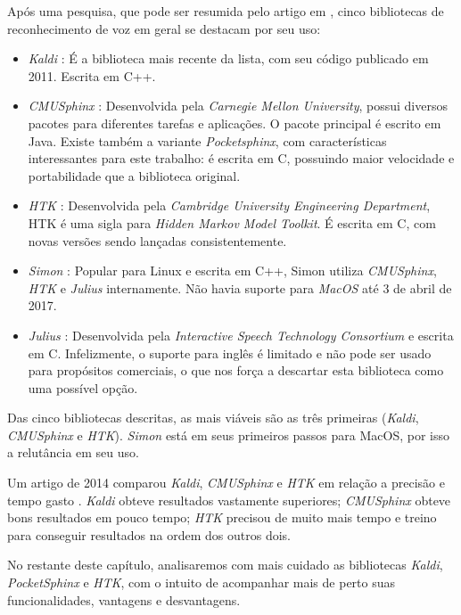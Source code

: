 Após uma pesquisa, que pode ser resumida pelo artigo em \citep{speechRecog:16}, cinco bibliotecas de reconhecimento de voz em geral se destacam por seu uso:

\begin{itemize}
\item \emph{Kaldi} \citep{kaldi}: É a biblioteca mais recente da lista, com seu código publicado em 2011. Escrita em C++.

\item \emph{CMUSphinx} \citep{cmusphinx}: Desenvolvida pela \emph{Carnegie Mellon University}, possui diversos pacotes para diferentes tarefas e aplicações. O pacote principal é escrito em Java. Existe também a variante \emph{Pocketsphinx}, com características interessantes para este trabalho: é escrita em C, possuindo maior velocidade e portabilidade que a biblioteca original.

\item \emph{HTK} \citep{htk}: Desenvolvida pela \emph{Cambridge University Engineering Department}, HTK é uma sigla para \emph{Hidden Markov Model Toolkit}. É escrita em C, com novas versões sendo lançadas consistentemente.

\item \emph{Simon} \citep{Simon}: Popular para Linux e escrita em C++, Simon utiliza \emph{CMUSphinx}, \emph{HTK} e \emph{Julius} internamente. Não havia suporte para \emph{MacOS} até 3 de abril de 2017.

\item \emph{Julius} \citep{Julius}: Desenvolvida pela \emph{Interactive Speech Technology Consortium} e escrita em C. Infelizmente, o suporte para inglês é limitado e não pode ser usado para propósitos comerciais, o que nos força a descartar esta biblioteca como uma possível opção.
\end{itemize}

Das cinco bibliotecas descritas, as mais viáveis são as três primeiras (\emph{Kaldi}, \emph{CMUSphinx} e \emph{HTK}). \emph{Simon} está em seus primeiros passos para MacOS, por isso a relutância em seu uso.

Um artigo de 2014 comparou \emph{Kaldi}, \emph{CMUSphinx} e \emph{HTK} em relação a precisão e tempo gasto \citep{compareSpeech}. \emph{Kaldi} obteve resultados vastamente superiores; \emph{CMUSphinx} obteve bons resultados em pouco tempo; \emph{HTK} precisou de muito mais tempo e treino para conseguir resultados na ordem dos outros dois.

No restante deste capítulo, analisaremos com mais cuidado as bibliotecas \emph{Kaldi}, \emph{PocketSphinx} e \emph{HTK}, com o intuito de acompanhar mais de perto suas funcionalidades, vantagens e desvantagens.

